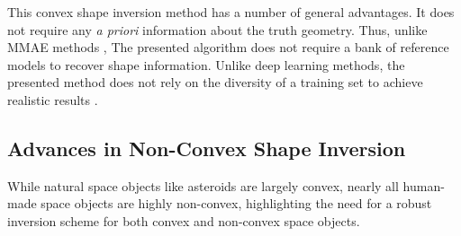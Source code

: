 This convex shape inversion method has a number of general advantages. It does not require any \textit{a priori} information about the truth geometry. Thus, unlike MMAE methods \cite{linares2014space}, The presented algorithm does not require a bank of reference models to recover shape information. Unlike deep learning methods, the presented method does not rely on the diversity of a training set to achieve realistic results \cite{furfaro2019,kerr2021}.

\subsection{Advances in Non-Convex Shape Inversion}

While natural space objects like asteroids are largely convex, nearly all human-made space objects are highly non-convex, highlighting the need for a robust inversion scheme for both convex and non-convex space objects.